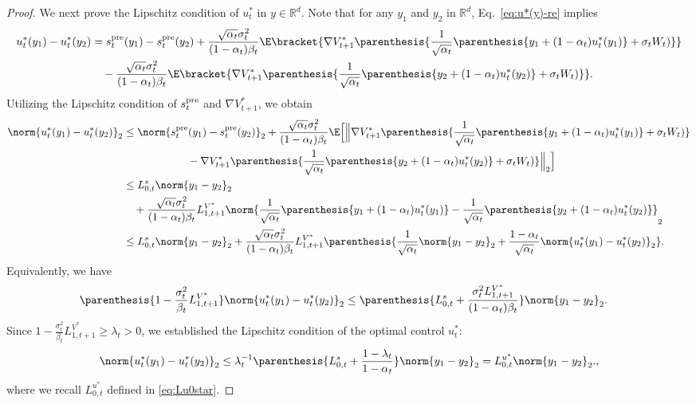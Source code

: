 \documentclass{article}
\newcommand{\R}{\mathbb{R}}
\begin{document}
\begin{proof}
We next prove the Lipschitz condition of $u_t^*$ in $y\in \R^d$. Note that for any $y_1$ and $y_2$ in $\R^d$, Eq.~\eqref{eq:u*(y)-re} implies
\begin{align*}
    u_t^*(y_1) - u_t^*(y_2) & = s_{t}^{\rm pre}(y_1) - s_{t}^{\rm pre}(y_2)  + \frac{\sqrt{\alpha_{t}}\sigma_{t}^{2}}{(1 - \alpha_{t})\beta_t}\E\bracket{\nabla V_{t+1}^{*}\parenthesis{\frac{1}{\sqrt{\alpha_t}}\parenthesis{y_1 + (1 - \alpha_t)u_t^*(y_1)} + \sigma_t W_t)}} \\ & \quad - \frac{\sqrt{\alpha_{t}}\sigma_{t}^{2}}{(1 - \alpha_{t})\beta_t}\E\bracket{\nabla V_{t+1}^{*}\parenthesis{\frac{1}{\sqrt{\alpha_t}}\parenthesis{y_2 + (1 - \alpha_t)u_t^*(y_2)} + \sigma_t W_t)}}.
\end{align*}
Utilizing the Lipschitz condition of $s_t^{\rm pre}$ and $\nabla V_{t+1}^{*}$, we obtain
\begin{align*}
    \norm{u_t^*(y_1) - u_t^*(y_2)}_2 & \leq \norm{s_{t}^{\rm pre}(y_1) - s_{t}^{\rm pre}(y_2) }_2  + \frac{\sqrt{\alpha_{t}}\sigma_{t}^{2}}{(1 - \alpha_{t})\beta_t}\E\Big[\Big\|\nabla V_{t+1}^{*}\parenthesis{\frac{1}{\sqrt{\alpha_t}}\parenthesis{y_1 + (1 - \alpha_t)u_t^*(y_1)} + \sigma_t W_t)} \\ & \qquad\qquad\qquad - \nabla V_{t+1}^{*}\parenthesis{\frac{1}{\sqrt{\alpha_t}}\parenthesis{y_2 + (1 - \alpha_t)u_t^*(y_2)} + \sigma_t W_t)}\Big\|_2\Big] \\ & \leq L_{0, t}^s\norm{y_1 - y_2}_2 \\ & \quad + \frac{\sqrt{\alpha_{t}}\sigma_{t}^{2}}{(1 - \alpha_{t})\beta_t}L_{1, t+1}^{V^*}\norm{\frac{1}{\sqrt{\alpha_t}}\parenthesis{y_1 + (1 - \alpha_t)u_t^*(y_1)} - \frac{1}{\sqrt{\alpha_t}}\parenthesis{y_2 + (1 - \alpha_t)u_t^*(y_2)}}_2 \\ & \leq L_{0, t}^s\norm{y_1 - y_2}_2  + \frac{\sqrt{\alpha_{t}}\sigma_{t}^{2}}{(1 - \alpha_{t})\beta_t}L_{1, t+1}^{V^*}\parenthesis{\frac{1}{\sqrt{\alpha_t}}\norm{y_1 - y_2}_2 + \frac{1 - \alpha_t}{\sqrt{\alpha_t}}\norm{u_t^*(y_1) - u_t^*(y_2)}_2}.
\end{align*}
Equivalently, we have 
\begin{align*}
      \parenthesis{1 - \frac{\sigma_t^2}{\beta_t}L^{V^*}_{1, t+1}}\norm{u_t^*(y_1) - u_t^*(y_2)}_2  & \leq \parenthesis{L_{0, t}^s + \frac{\sigma_t^2 L^{V^*}_{1, t+1}}{(1- \alpha_t)\beta_t}}\norm{y_1 - y_2}_2.
\end{align*}
Since $1 - \frac{\sigma_t^2}{\beta_t}L^{V^*}_{1, t+1}\geq \lambda_t > 0$, we established the Lipschitz condition of the optimal control $u_t^*$:
\begin{align*}
    \norm{u_t^*(y_1) - u_t^*(y_2)}_2 \leq \lambda_{t}^{-1}\parenthesis{L_{0, t}^s + \frac{1 - \lambda_t}{1- \alpha_t}}\norm{y_1 - y_2}_2 = L_{0, t}^{u^*}\norm{y_1 - y_2}_2.,
\end{align*}
where we recall $L_{0, t}^{u^*}$ defined in \eqref{eq:Lu0star}.


\end{proof}
\end{document}
